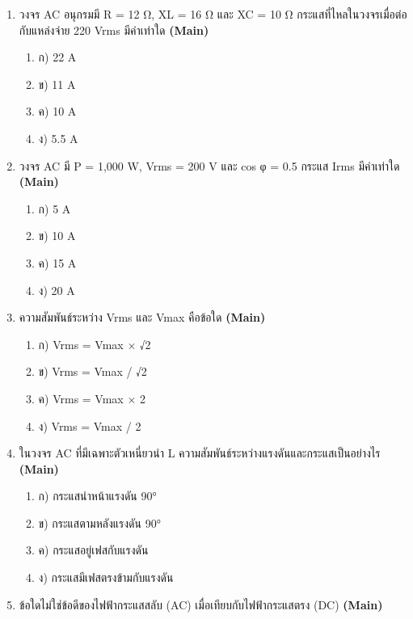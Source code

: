 \documentclass[12pt]{article}
\begin{document}
\begin{enumerate}[label=\arabic*.]
\begin{enumerate}[label=)]
\item ก) ω คือความถี่เชิงมุม มีหน่วยเรเดียน/วินาที
\item ข) ω คือความถี่ มีหน่วยเฮิรตซ์
\item ค) ω คือมุมเฟสเริ่มต้น
\item ง) ω คือแรงดันไฟฟ้าสูงสุด
\end{enumerate}
\item วงจร AC อนุกรมมี R = 12 Ω, XL = 16 Ω และ XC = 10 Ω กระแสที่ไหลในวงจรเมื่อต่อกับแหล่งจ่าย 220 Vrms มีค่าเท่าใด \hfill \textbf{\small (Main)}
\begin{enumerate}[label=)]
\item ก) 22 A
\item ข) 11 A
\item ค) 10 A
\item ง) 5.5 A
\end{enumerate}
\item วงจร AC มี P = 1,000 W, Vrms = 200 V และ cos φ = 0.5 กระแส Irms มีค่าเท่าใด \hfill \textbf{\small (Main)}
\begin{enumerate}[label=)]
\item ก) 5 A
\item ข) 10 A
\item ค) 15 A
\item ง) 20 A
\end{enumerate}
\item ความสัมพันธ์ระหว่าง Vrms และ Vmax คือข้อใด \hfill \textbf{\small (Main)}
\begin{enumerate}[label=)]
\item ก) Vrms = Vmax × √2
\item ข) Vrms = Vmax / √2
\item ค) Vrms = Vmax × 2
\item ง) Vrms = Vmax / 2
\end{enumerate}
\item ในวงจร AC ที่มีเฉพาะตัวเหนี่ยวนำ L ความสัมพันธ์ระหว่างแรงดันและกระแสเป็นอย่างไร \hfill \textbf{\small (Main)}
\begin{enumerate}[label=)]
\item ก) กระแสนำหน้าแรงดัน 90°
\item ข) กระแสตามหลังแรงดัน 90°
\item ค) กระแสอยู่เฟสกับแรงดัน
\item ง) กระแสมีเฟสตรงข้ามกับแรงดัน
\end{enumerate}
\item ข้อใดไม่ใช่ข้อดีของไฟฟ้ากระแสสลับ (AC) เมื่อเทียบกับไฟฟ้ากระแสตรง (DC) \hfill \textbf{\small (Main)}

\end{enumerate}
\end{document}

